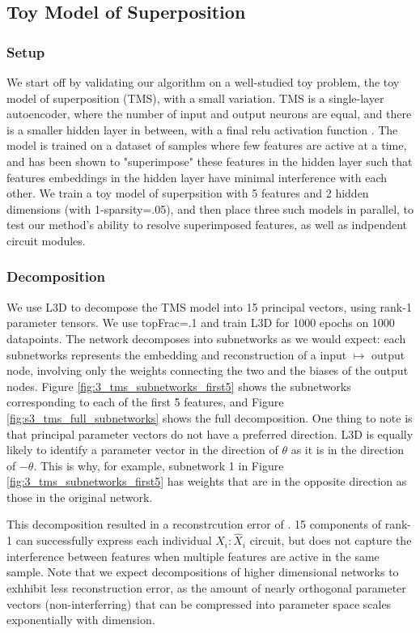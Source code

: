 \documentclass{article}
\theoremstyle{plain}
\theoremstyle{definition}
\theoremstyle{remark}
\begin{document}
\subsection{Toy Model of Superposition}


\subsubsection{Setup}


We start off by validating our algorithm on a well-studied toy problem, the toy model of superposition (TMS), with a small variation. TMS is a single-layer autoencoder, where the number of input and output neurons are equal, and there is a smaller hidden layer in between, with a final relu activation function \cite{elhage2022toy}. The model is trained on a dataset of samples where few features are active at a time, and has been shown to "superimpose" these features in the hidden layer such that features embeddings in the hidden layer have minimal interference with each other. We train a toy model of superpsition with 5 features and 2 hidden dimensions (with 1-sparsity=.05), and then place three such models in parallel, to test our method's ability to resolve superimposed features, as well as indpendent circuit modules.



\subsubsection{Decomposition}
We use L3D to decompose the TMS model into 15 principal vectors, using rank-1   parameter tensors. We use topFrac=.1 and train L3D for 1000 epochs on 1000 datapoints. The network decomposes into subnetworks as we would expect: each subnetworks represents the embedding and reconstruction of a input $\mapsto$ output node, involving only the weights connecting the two and the biases of the output nodes. Figure \ref{fig:3_tms_subnetworks_first5} shows the subnetworks corresponding to each of the first 5 features, and Figure \ref{fig:s3_tms_full_subnetworks} shows the full decomposition.  One thing to note is that principal parameter vectors do not have a preferred direction. L3D is equally likely to identify a parameter vector in the direction of $\theta$ as it is in the direction of $-\theta$. This is why, for example, subnetwork 1 in Figure \ref{fig:3_tms_subnetworks_first5} has weights that are in the opposite direction as those in the original network.


This decomposition resulted in a reconstrcution error of . 15 components of rank-1 can successfully express each individual $X_i:\hat{X}_i$ circuit, but does not capture the interference between features when multiple features are active in the same sample. Note that we expect decompositions of higher dimensional networks to exhhibit less reconstruction error, as the amount of nearly orthogonal parameter vectors (non-interferring) that can be compressed into parameter space scales exponentially with dimension.
\end{document}
